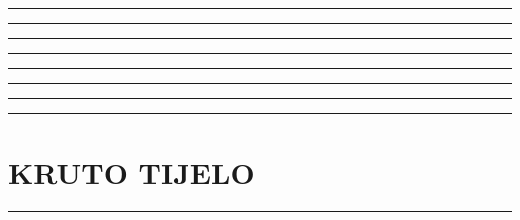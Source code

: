 \documentclass[10pt]{book}
\newcounter{zadatak} %
\newcounter{cjelina}
\begin{document}
{\color{boja} \rule{\linewidth}{0.3mm} }


\vspace{1cm}


{\color{boja} \rule{\linewidth}{0.3mm} }






{\color{boja} \rule{\linewidth}{0.3mm} }

\vspace{0.2cm} 




{\color{boja} \rule{\linewidth}{0.3mm} }

\vspace{0.2cm}



{\color{boja} \rule{\linewidth}{0.3mm} }




\vspace{1cm}


{\color{boja} \rule{\linewidth}{0.3mm} }



\vspace{1cm}


{\color{boja} \rule{\linewidth}{0.3mm} }


\vspace{1cm}


{\color{boja} \rule{\linewidth}{0.3mm} }



\newpage
\chapter{KRUTO TIJELO}
\setcounter{zadatak}{0}




{\color{boja} \rule{\linewidth}{0.3mm} }

\vspace{0.2cm} 
\end{document}

